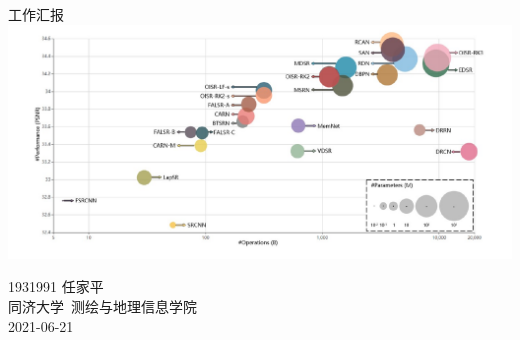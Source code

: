 \documentclass[a4paper, 12pt]{article}
\begin{document}
\begin{center}
    {\Huge 
        工作汇报}\\[20pt]
    
    \includegraphics[width=1.0\textwidth]{pic/cover.jpg}  

    {\Large 
        1931991 任家平\\[12pt]
        同济大学~测绘与地理信息学院\\[12pt]
        2021-06-21}
\end{center}
\thispagestyle{empty}



\newpage
{}
\tableofcontents
\newpage
{}


\newpage
\nocite{*}


\end{document}
